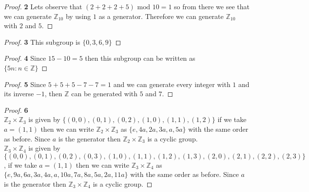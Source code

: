 \documentclass[11pt]{article}
\begin{document}
	\begin{proof}{\textbf{2}}
		Lets observe that $(2+2+2+5)\text{ mod }10 = 1$ so from there we see that we can generate $\mathbb{Z}_{10}$ by using $1$ as a generator. Therefore we can generate $\mathbb{Z}_{10}$ with $2$ and $5$.
	\end{proof}
	\begin{proof}{\textbf{3}}
		This subgroup is $\{0,3,6,9\}$ 
	\end{proof}
	\begin{proof}{\textbf{4}}
		Since $15 - 10 = 5$ then this subgroup can be written as\\ $\{5n: n \in \mathbb{Z}\}$
	\end{proof}
	\begin{proof}{\textbf{5}}
		Since $5+5+5-7-7 = 1$ and we can generate every integer with $1$ and its inverse $-1$, then $\mathbb{Z}$ can be generated with $5$ and $7$.
	\end{proof}
\cleardoublepage
	\begin{proof}{\textbf{6}}\\
		$\mathbb{Z}_2 \times \mathbb{Z}_3$ is given by $\{(0,0), (0,1), (0,2), (1,0), (1,1), (1,2)\}$ if we take $a=(1,1)$ then we can write $\mathbb{Z}_2 \times \mathbb{Z}_3$ as $\{e, 4a, 2a, 3a, a, 5a\}$ with the same order as before. Since $a$ is the generator then $\mathbb{Z}_2 \times \mathbb{Z}_3$ is a cyclic group.\\
		$\mathbb{Z}_3 \times \mathbb{Z}_4$ is given by $\{(0,0), (0,1), (0,2), (0,3), (1,0), (1,1), (1,2), (1,3), (2,0), (2,1), (2,2), (2,3)\}$, if we take $a=(1,1)$ then we can write $\mathbb{Z}_3 \times \mathbb{Z}_4$ as $\{e, 9a, 6a, 3a, 4a, a, 10a, 7a, 8a, 5a, 2a, 11a\}$ with the same order as before. Since $a$ is the generator then $\mathbb{Z}_3 \times \mathbb{Z}_4$ is a cyclic group.
	\end{proof}
\end{document}
